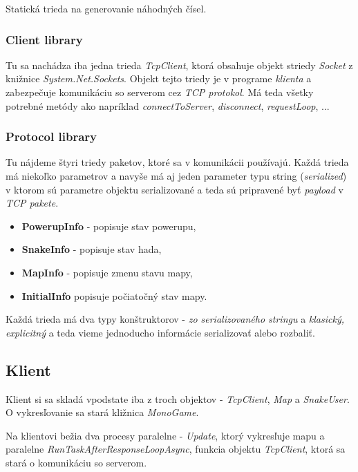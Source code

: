 \documentclass{article}
\begin{document}
Statická trieda na generovanie náhodných čísel.

\subsubsection{Client library}

Tu sa nachádza iba jedna trieda \textit{TcpClient}, ktorá obsahuje objekt striedy \textit{Socket} z knižnice \textit{System.Net.Sockets}. Objekt tejto triedy je v programe \textit{klienta} a zabezpečuje komunikáciu so serverom cez \textit{TCP protokol}. Má teda všetky potrebné metódy ako napríklad \textit{connectToServer}, \textit{disconnect}, \textit{requestLoop}, ...

\subsubsection{Protocol library}

Tu nájdeme štyri triedy paketov, ktoré sa v komunikácii používajú. Každá trieda má niekoľko parametrov a navyše má aj jeden parameter typu string (\textit{serialized}) v ktorom sú parametre objektu serializované a teda sú pripravené byť \textit{payload} v \textit{TCP pakete}. 

\begin{itemize}
    \item \textbf{PowerupInfo} - popisuje stav powerupu,
    \item \textbf{SnakeInfo} - popisuje stav hada,
    \item \textbf{MapInfo} - popisuje zmenu stavu mapy,
    \item \textbf{InitialInfo} popisuje počiatočný stav mapy.
\end{itemize}

Každá trieda má dva typy konštruktorov - \textit{zo serializovaného stringu} a \textit{klasický, explicitný} a teda vieme jednoducho informácie serializovať alebo rozbaliť.

\subsection{Klient}

Klient si sa skladá vpodstate iba z troch objektov - \textit{TcpClient}, \textit{Map} a \textit{SnakeUser}. O vykresľovanie sa stará kližnica \textit{MonoGame}. 

Na klientovi bežia dva procesy paralelne - \textit{Update}, ktorý vykresľuje mapu a paralelne \textit{RunTaskAfterResponseLoopAsync}, funkcia objektu \textit{TcpClient}, ktorá sa stará o komunikáciu so serverom.
\end{document}
